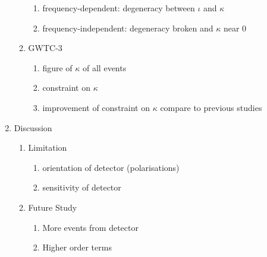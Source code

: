 \documentclass[twocolumn]{aastex631}
\begin{document}
\begin{enumerate}
\begin{enumerate}
\begin{enumerate}
            \item frequency-dependent: degeneracy between $\iota$ and $\kappa$
            \item frequency-independent: degeneracy broken and $\kappa$ near $0$
        \end{enumerate}
        \item GWTC-3
        \begin{enumerate}
            \item figure of $\kappa$ of all events
            \item constraint on $\kappa$
            \item improvement of constraint on $\kappa$ compare to previous studies
        \end{enumerate}
    \end{enumerate}
    \item Discussion
    \begin{enumerate}
        \item Limitation
        \begin{enumerate}
            \item orientation of detector (polarisations)
            \item sensitivity of detector
        \end{enumerate}
        \item Future Study
        \begin{enumerate}
            \item More events from detector
            \item Higher order terms
        \end{enumerate}
    \end{enumerate}
\end{enumerate}
\end{document}
